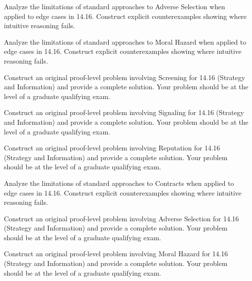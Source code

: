\documentclass[12pt,a4paper]{exam}
\begin{document}
\begin{questions}

\question[4]
Analyze the limitations of standard approaches to Adverse Selection when applied to edge cases in 14.16. Construct explicit counterexamples showing where intuitive reasoning fails.

\vspace{0.3cm}

\question[2]
Analyze the limitations of standard approaches to Moral Hazard when applied to edge cases in 14.16. Construct explicit counterexamples showing where intuitive reasoning fails.

\vspace{0.3cm}

\question[5]
Construct an original proof-level problem involving Screening for 14.16 (Strategy and Information) and provide a complete solution. Your problem should be at the level of a graduate qualifying exam.

\vspace{0.3cm}

\question[3]
Construct an original proof-level problem involving Signaling for 14.16 (Strategy and Information) and provide a complete solution. Your problem should be at the level of a graduate qualifying exam.

\vspace{0.3cm}

\question[3]
Construct an original proof-level problem involving Reputation for 14.16 (Strategy and Information) and provide a complete solution. Your problem should be at the level of a graduate qualifying exam.

\vspace{0.3cm}

\question[4]
Analyze the limitations of standard approaches to Contracts when applied to edge cases in 14.16. Construct explicit counterexamples showing where intuitive reasoning fails.

\vspace{0.3cm}

\question[3]
Construct an original proof-level problem involving Adverse Selection for 14.16 (Strategy and Information) and provide a complete solution. Your problem should be at the level of a graduate qualifying exam.

\vspace{0.3cm}

\question[7]
Construct an original proof-level problem involving Moral Hazard for 14.16 (Strategy and Information) and provide a complete solution. Your problem should be at the level of a graduate qualifying exam.


\end{questions}
\end{document}
